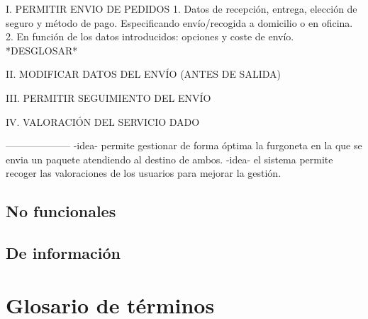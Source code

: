 I. PERMITIR ENVIO DE PEDIDOS
1. Datos de recepción, entrega, elección de seguro y método de pago. Especificando envío/recogida a domicilio o en oficina.
2. En función de los datos introducidos: opciones y coste de envío.
*DESGLOSAR*

II. MODIFICAR DATOS DEL ENVÍO (ANTES DE SALIDA)

III. PERMITIR SEGUIMIENTO DEL ENVÍO

IV. VALORACIÓN DEL SERVICIO DADO






--------------------
-idea- permite gestionar de forma óptima la furgoneta en la que se envia un paquete atendiendo al destino de ambos.
-idea- el sistema permite recoger las valoraciones de los usuarios para mejorar la gestión.
\newpage
\subsection{No funcionales}

\newpage
\subsection{De información}

\newpage

\section{Glosario de términos}

\newpage


